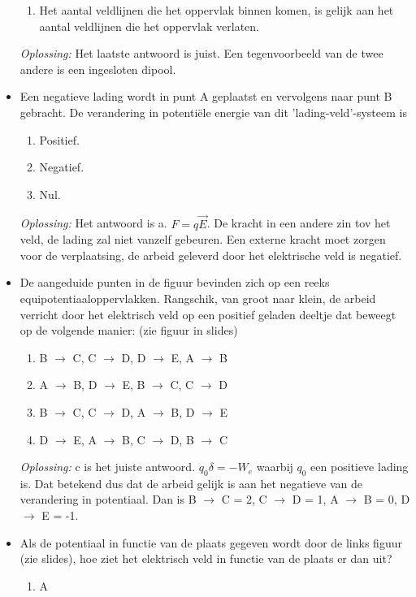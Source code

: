 \documentclass[12pt,a4paper]{article}
\begin{document}
\begin{itemize}
\begin{enumerate}[label=\alph*]
		\item Het aantal veldlijnen die het oppervlak binnen komen, is gelijk aan het aantal veldlijnen die het oppervlak verlaten. 
	\end{enumerate}
	\textit{Oplossing:} Het laatste antwoord is juist. Een tegenvoorbeeld van de twee andere is een ingesloten dipool. 
	\item Een negatieve lading wordt in punt A geplaatst en vervolgens naar punt B gebracht. De verandering in potentiële energie van dit 'lading-veld'-systeem is
	\begin{enumerate}[label=\alph*]
		\item Positief.
		\item Negatief.
		\item Nul.
	\end{enumerate}
	\textit{Oplossing:} Het antwoord is a. \(F = q\vec{E}\). De kracht in een andere zin tov het veld, de lading zal niet vanzelf gebeuren. Een externe kracht moet zorgen voor de verplaatsing, de arbeid geleverd door het elektrische veld is negatief.
	\item De aangeduide punten in de figuur bevinden zich op een reeks equipotentiaaloppervlakken. Rangschik, van groot naar klein, de arbeid verricht door het elektrisch veld op een positief geladen deeltje dat beweegt op de volgende manier: (zie figuur in slides)
	\begin{enumerate}[label=\alph*]
		\item B $\rightarrow$ C, C $\rightarrow$ D, D $\rightarrow$ E, A $\rightarrow$ B
		\item A $\rightarrow$ B, D $\rightarrow$ E, B $\rightarrow$ C, C $\rightarrow$ D
		\item B $\rightarrow$ C, C $\rightarrow$ D, A $\rightarrow$ B, D $\rightarrow$ E
		\item D $\rightarrow$ E, A $\rightarrow$ B, C $\rightarrow$ D, B $\rightarrow$ C
	\end{enumerate}
	\textit{Oplossing:} c is het juiste antwoord. \(q_0 \delta = -W_e\) waarbij $q_0$ een positieve lading is. Dat betekend dus dat de arbeid gelijk is aan het negatieve van de verandering in potentiaal. Dan is B $\rightarrow$ C = 2, C $\rightarrow$ D = 1, A $\rightarrow$ B = 0, D $\rightarrow$ E = -1.
	\item Als de potentiaal in functie van de plaats gegeven wordt door de links figuur (zie slides), hoe ziet het elektrisch veld in functie van de plaats er dan uit?
	\begin{enumerate}[label=\alph*]
		\item A

\end{enumerate}
\end{itemize}
\end{document}
